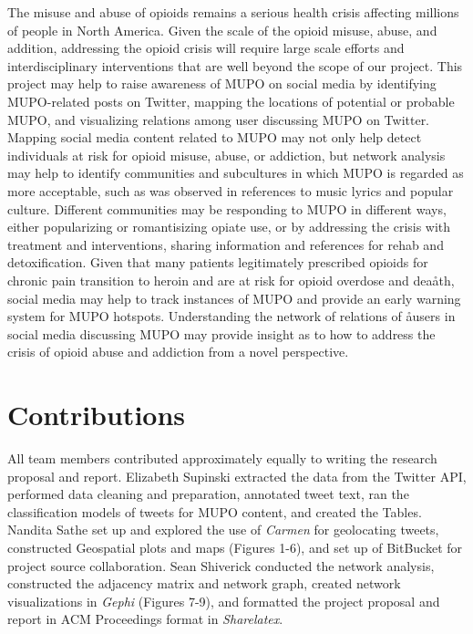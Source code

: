 \documentclass[sigconf]{acmart}
\begin{document}
The misuse and abuse of opioids remains a serious health crisis affecting 
millions of people in North America. Given the scale of the opioid misuse, 
abuse, and addition, addressing the opioid crisis will require large scale 
efforts and interdisciplinary interventions that are well beyond the scope 
of our project. This project may help to raise awareness of MUPO on social
media by identifying MUPO-related posts on Twitter, mapping the locations of 
potential or probable MUPO, and visualizing relations among user discussing 
MUPO on Twitter. Mapping social media content related to MUPO may not only
help detect individuals at risk for opioid misuse, abuse, or addiction, 
but network analysis may help to identify communities and subcultures in 
which MUPO is regarded as more acceptable, such as was observed in references
to music lyrics and popular culture. Different communities may be responding
to MUPO in different ways, either popularizing or romantisizing opiate use, 
or by addressing the crisis with treatment and interventions, sharing 
information and references for rehab and detoxification. Given that many 
patients legitimately prescribed opioids for chronic pain transition to 
heroin and are at risk for opioid overdose and deaåth, social media may help
to track instances of MUPO and provide an early warning system for MUPO 
hotspots. Understanding the network of relations of åusers in social media
discussing MUPO may provide insight as to how to address the crisis of 
opioid abuse and addiction from a novel perspective. 
 

\section{Contributions}

All team members contributed approximately equally to writing the research 
proposal and report. Elizabeth Supinski extracted the data from the Twitter 
API, performed data cleaning and preparation, annotated tweet text, ran the 
classification models of tweets for MUPO content, and created the Tables. 
Nandita Sathe set up and explored the use of \emph{Carmen} for geolocating 
tweets, constructed Geospatial plots and maps (Figures 1-6), and set up of 
BitBucket for project source collaboration. Sean Shiverick conducted the 
network analysis, constructed the adjacency matrix and network graph, 
created network visualizations in \emph{Gephi} (Figures 7-9), and formatted 
the project proposal and report in ACM Proceedings format in \emph{Sharelatex}.
\end{document}
